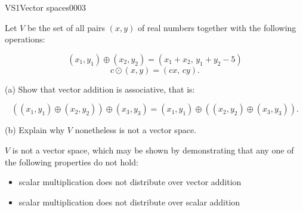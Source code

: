 
\begin{exercise}{VS1}{Vector spaces}{0003} 
\begin{exerciseStatement} 

 Let \(V\) be the set of all pairs \((x,y)\) of real numbers together with the following operations: 

 \[(x_1,y_1)\oplus (x_2,y_2)=\left(x_{1} + x_{2},\,y_{1} + y_{2} - 5\right)\]\[c \odot (x,y) =\left(c x,\,c y\right).\] 

 (a) Show that vector addition is associative, that is: 

 \[
      \left((x_1,y_1)\oplus(x_2,y_2)\right)\oplus(x_3,y_3)=(x_1,y_1)\oplus\left((x_2,y_2)\oplus(x_3,y_3)\right).
    \] 

 (b) Explain why \(V\) nonetheless is not a vector space. 

 \end{exerciseStatement}
 \begin{exerciseAnswer} 

 \(V\) is not a vector space, which may be shown by demonstrating that any one of the following properties do not hold: 

 

\begin{itemize}
\item scalar multiplication does not distribute over vector addition
\item scalar multiplication does not distribute over scalar addition
\end{itemize}

     \end{exerciseAnswer}
 \end{exercise}




